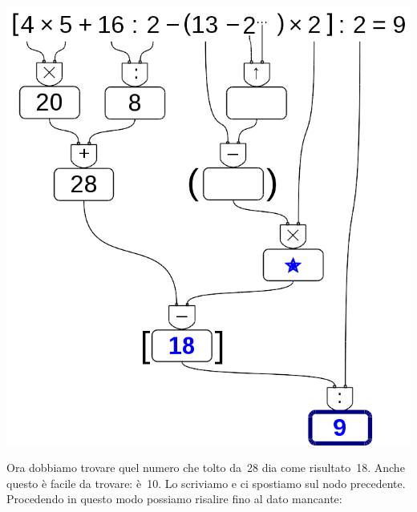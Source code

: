 \begin{esempio}
\begin{inaccessibleblock}[]
 \begin{center}
  \includegraphics[scale=0.35]{img/op_buco2.png}
 \end{center}
\end{inaccessibleblock}
 
  Ora dobbiamo trovare quel numero che tolto da~28 dia come risultato~18. 
  Anche questo è facile da trovare: è~10. Lo scriviamo e ci spostiamo
  sul nodo precedente. Procedendo in questo modo possiamo risalire fino
  al dato mancante:
  

\end{esempio}

